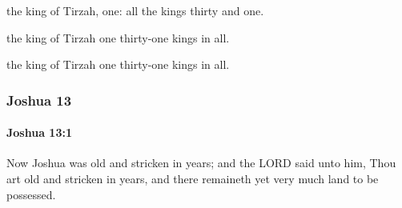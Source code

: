 			\begin{versebox}
					\item[BHS] 
					\item[ASV] the king of Tirzah, one: all the kings thirty and one.
					\item[NIV] the king of Tirzah one thirty-one kings in all.
					\item[NRSV] the king of Tirzah one thirty-one kings in all.
			\end{versebox}
	\subsubsection{Joshua 13} %
		\label{JOSHUA-13}

		\paragraph{Joshua 13:1} %
			\label{JOSHUA-13-1}

			Now Joshua was old and stricken in years; and the LORD said unto him, Thou art old and stricken in years, and there remaineth yet very much land to be possessed.

